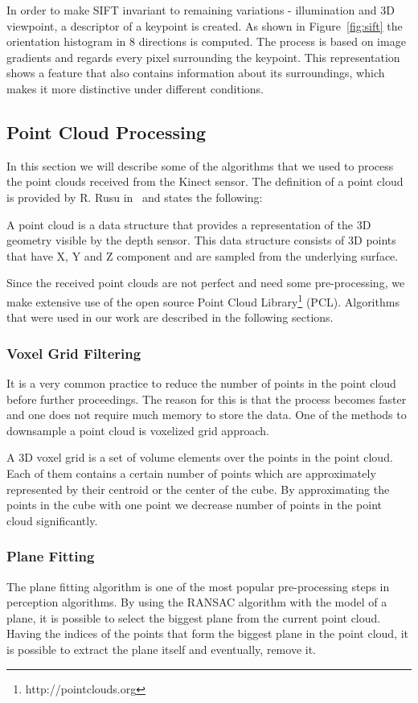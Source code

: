 In order to make SIFT invariant to remaining variations - illumination and 3D viewpoint, a descriptor of a keypoint is created. As shown in Figure~\ref{fig:sift} the orientation histogram in 8 directions is computed. The process is based on image gradients and regards every pixel surrounding the keypoint. This representation shows a feature that also contains information about its surroundings, which makes it more distinctive under different conditions.


\subsection{Point Cloud Processing}
In this section we will describe some of the algorithms that we used to process the point clouds received from the Kinect sensor. The definition of a point cloud is provided by R. Rusu in~\cite{Rusu_ICRA2011_PCL} and states the following:

A point cloud is a data structure that provides a representation of the 3D geometry visible by the depth sensor. This data structure consists of 3D points that have X, Y and Z component and are sampled from the underlying surface.  

Since the received point clouds are not perfect and need some pre-processing, we make extensive use of the open source Point Cloud Library\footnote{http://pointclouds.org} (PCL). Algorithms that were used in our work are described in the following sections.

\subsubsection{Voxel Grid Filtering}
It is a very common practice to reduce the number of points in the point cloud before further proceedings. The reason for this is that the process becomes faster and one does not require much memory to store the data. One of the methods to downsample a point cloud is voxelized grid approach.

A 3D voxel grid is a set of volume elements over the points in the point cloud. Each of them contains a certain number of points which are approximately represented by their centroid or the center of the cube. By approximating the points in the cube with one point we decrease number of points in the point cloud significantly. 

\subsubsection{Plane Fitting}
The plane fitting algorithm is one of the most popular pre-processing steps in perception algorithms. By using the RANSAC algorithm with the model of a plane, it is possible to select the biggest plane from the current point cloud. Having the indices of the points that form the biggest plane in the point cloud, it is possible to extract the plane itself and eventually, remove it. 

